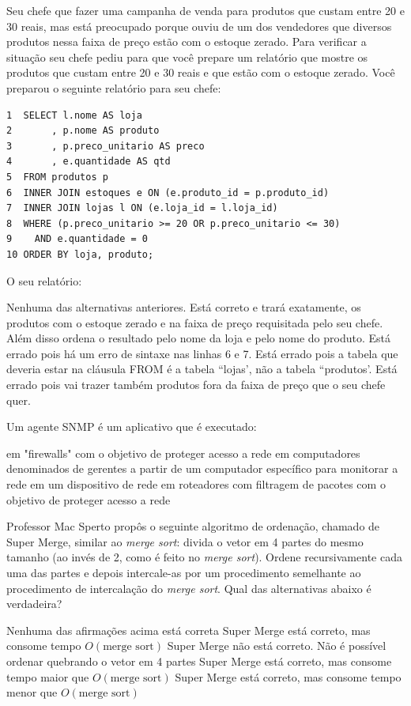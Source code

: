 \documentclass[12pt, addpoints]{exam}
\begin{document}
\begin{questions}
\question
Seu chefe que fazer uma campanha de venda para produtos que custam entre 20 e 30
reais, mas está preocupado porque ouviu de um dos vendedores que diversos
produtos nessa faixa de preço estão com o estoque zerado. Para verificar a
situação seu chefe pediu para que você prepare um relatório que mostre os
produtos que custam entre 20 e 30 reais e que estão com o estoque zerado. Você
preparou o seguinte relatório para seu chefe:
\begin{tcolorbox}
 \begin{verbatim}1  SELECT l.nome AS loja
2       , p.nome AS produto
3       , p.preco_unitario AS preco
4       , e.quantidade AS qtd
5  FROM produtos p
6  INNER JOIN estoques e ON (e.produto_id = p.produto_id)
7  INNER JOIN lojas l ON (e.loja_id = l.loja_id)
8  WHERE (p.preco_unitario >= 20 OR p.preco_unitario <= 30)
9    AND e.quantidade = 0
10 ORDER BY loja, produto;
 \end{verbatim}
\end{tcolorbox}
O seu relatório:
\begin{choices}
\choice Nenhuma das alternativas anteriores.
\choice Está correto e trará exatamente, os produtos com o estoque zerado e na faixa de preço requisitada pelo seu chefe. Além disso ordena o resultado pelo nome da loja e pelo nome do produto.
\choice Está errado pois há um erro de sintaxe nas linhas 6 e 7.
\choice Está errado pois a tabela que deveria estar na cláusula FROM é a tabela ``lojas', não a tabela ``produtos'.
\choice Está errado pois vai trazer também produtos fora da faixa de preço que o seu chefe quer.
\end{choices}

\question
Um agente SNMP é um aplicativo que é executado:
\begin{choices}
\choice em "firewalls" com o objetivo de proteger acesso a rede
\choice em computadores denominados de gerentes
\choice a partir de um computador específico para monitorar a rede
\choice em um dispositivo de rede
\choice em roteadores com filtragem de pacotes com o objetivo de proteger acesso a rede
\end{choices}

\question
Professor Mac Sperto propôs o seguinte algoritmo de ordenação, chamado de Super Merge, similar ao \textit{merge sort}: divida o vetor em 4 partes do mesmo tamanho (ao invés de 2, como é feito no \textit{merge sort}). Ordene recursivamente cada uma das partes e depois intercale-as por um procedimento semelhante ao procedimento de intercalação do \textit{merge sort}. Qual das alternativas abaixo é verdadeira?
\begin{choices}
\choice Nenhuma das afirmações acima está correta
\choice Super Merge está correto, mas consome tempo \( O(\text{merge sort}) \)
\choice Super Merge não está correto. Não é possível ordenar quebrando o vetor em 4 partes
\choice Super Merge está correto, mas consome tempo maior que \( O(\text{merge sort}) \)
\choice Super Merge está correto, mas consome tempo menor que \( O(\text{merge sort}) \)
\end{choices}


\end{questions}
\end{document}
